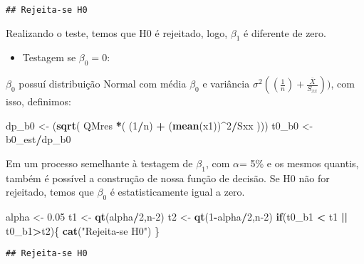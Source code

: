 \documentclass[
]{article}
\newenvironment{Shaded}{\begin{snugshade}}{\end{snugshade}}
\newcommand{\ControlFlowTok}[1]{\textcolor[rgb]{0.13,0.29,0.53}{\textbf{#1}}}
\newcommand{\DecValTok}[1]{\textcolor[rgb]{0.00,0.00,0.81}{#1}}
\newcommand{\FloatTok}[1]{\textcolor[rgb]{0.00,0.00,0.81}{#1}}
\newcommand{\KeywordTok}[1]{\textcolor[rgb]{0.13,0.29,0.53}{\textbf{#1}}}
\newcommand{\NormalTok}[1]{#1}
\newcommand{\OperatorTok}[1]{\textcolor[rgb]{0.81,0.36,0.00}{\textbf{#1}}}
\newcommand{\StringTok}[1]{\textcolor[rgb]{0.31,0.60,0.02}{#1}}
\providecommand{\tightlist}{%
  \setlength{\itemsep}{0pt}\setlength{\parskip}{0pt}}
\begin{document}
\begin{verbatim}
## Rejeita-se H0
\end{verbatim}

Realizando o teste, temos que H0 é rejeitado, logo, \(\beta_1\) é
diferente de zero.

\begin{itemize}
\tightlist
\item
  Testagem se \(\beta_0 = 0\):
\end{itemize}

\(\beta_0\) possuí distribuição Normal com média \(\beta_0\) e variância
\(\sigma^2((\frac{1}{n})+\frac{\bar{X}}{S_{xx}}))\), com isso,
definimos:

\begin{Shaded}
\begin{Highlighting}[]
\NormalTok{dp_b0 <-}\StringTok{ }\NormalTok{(}\KeywordTok{sqrt}\NormalTok{( QMres }\OperatorTok{*}\NormalTok{( (}\DecValTok{1}\OperatorTok{/}\NormalTok{n) }\OperatorTok{+}\StringTok{ }\NormalTok{(}\KeywordTok{mean}\NormalTok{(x1))}\OperatorTok{^}\DecValTok{2}\OperatorTok{/}\NormalTok{Sxx )))}
\NormalTok{t0_b0 <-}\StringTok{ }\NormalTok{b0_est}\OperatorTok{/}\NormalTok{dp_b0}
\end{Highlighting}
\end{Shaded}

Em um processo semelhante à testagem de \(\beta_1\), com \(\alpha\)= 5\%
e os mesmos quantis, também é possível a construção de nossa função de
decisão. Se H0 não for rejeitado, temos que \(\beta_0\) é
estatisticamente igual a zero.

\begin{Shaded}
\begin{Highlighting}[]
\NormalTok{alpha <-}\StringTok{ }\FloatTok{0.05}
\NormalTok{t1 <-}\StringTok{ }\KeywordTok{qt}\NormalTok{(alpha}\OperatorTok{/}\DecValTok{2}\NormalTok{,n}\DecValTok{-2}\NormalTok{)}
\NormalTok{t2 <-}\StringTok{ }\KeywordTok{qt}\NormalTok{(}\DecValTok{1}\OperatorTok{-}\NormalTok{alpha}\OperatorTok{/}\DecValTok{2}\NormalTok{,n}\DecValTok{-2}\NormalTok{)}
\ControlFlowTok{if}\NormalTok{(t0_b1 }\OperatorTok{<}\StringTok{ }\NormalTok{t1 }\OperatorTok{||}\StringTok{ }\NormalTok{t0_b1}\OperatorTok{>}\NormalTok{t2)\{}
  \KeywordTok{cat}\NormalTok{(}\StringTok{"Rejeita-se H0"}\NormalTok{)}
\NormalTok{\}}
\end{Highlighting}
\end{Shaded}

\begin{verbatim}
## Rejeita-se H0
\end{verbatim}
\end{document}
